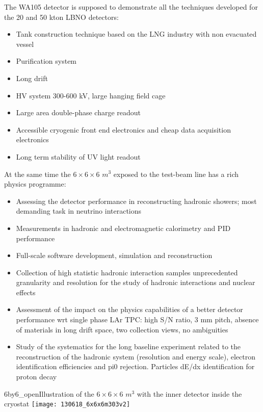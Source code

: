 The WA105 detector is supposed to demonstrate all the techniques developed for the 20 and 50 kton LBNO detectors:

\begin{itemize}
\item{Tank construction technique based on the LNG industry with non evacuated vessel}
\item{Purification system}
\item{Long drift}
\item{HV system 300-600 kV, large hanging field cage}
\item{Large area double-phase charge readout}
\item{Accessible cryogenic front end electronics and cheap data acquisition electronics}
\item{Long term stability of UV light readout}
\end{itemize}

At the same time the $6\times 6\times 6$ $m^3$ exposed to the test-beam line has a rich physics programme:

\begin{itemize}
\item{Assessing the detector performance in reconstructing hadronic showers; most demanding task in neutrino interactions}
\item{ Measurements in hadronic and electromagnetic calorimetry and PID performance}
\item{Full-scale software development, simulation and reconstruction}
\item{Collection of high statistic hadronic interaction samples  unprecedented granularity and resolution for the study of hadronic interactions and nuclear effects}
\item{Assessment of the impact on the physics capabilities of a better detector performance wrt  single phase LAr TPC: high S/N ratio, 3 mm pitch, absence of materials in long drift space, two collection views, no ambiguities}
\item{Study of the systematics for the long baseline experiment related to the reconstruction of the hadronic system (resolution and energy scale), electron identification efficiencies and pi0 rejection. Particles dE/dx identification for proton decay}
\end{itemize}


\begin{cdrfigure}{6by6_open}{Illustration of the  $6\times 6\times 6$ $m^3$  with the inner detector inside the cryostat}
\texttt{[image: 130618\_6x6x6m303v2]}
\end{cdrfigure}

